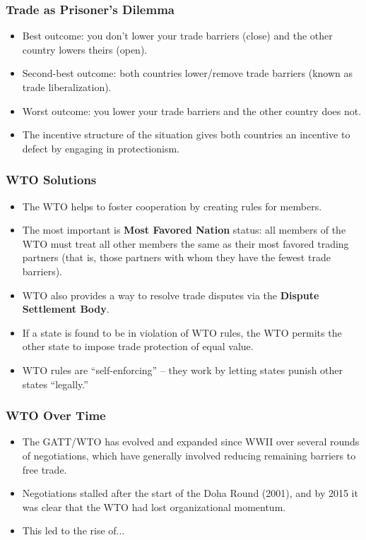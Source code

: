 \documentclass{beamer}
\begin{document}
\begin{frame} 
	\frametitle{\LARGE{Trade as Prisoner's Dilemma}}
	\begin{itemize}
			\item Best outcome: you don't lower your trade barriers (close) and the other country lowers theirs (open). \pause 
			\item Second-best outcome: both countries lower/remove trade barriers (known as trade liberalization). \pause
			\item Worst outcome: you lower your trade barriers and the other country does not. \pause
			\item The incentive structure of the situation gives both countries an incentive to defect by engaging in protectionism. 
	\end{itemize}
\end{frame}

\begin{frame} 
	\frametitle{\LARGE{WTO Solutions}}
	\begin{itemize}
		\item The WTO helps to foster cooperation by creating rules for members. \pause
		\item The most important is \textbf{Most Favored Nation} status: all members of the WTO must treat all other members the same as their most favored trading partners (that is, those partners with whom they have the fewest trade barriers). \pause
		\item WTO also provides a way to resolve trade disputes via the \textbf{Dispute Settlement Body}. \pause
		\item If a state is found to be in violation of WTO rules, the WTO permits the other state to impose trade protection of equal value. \pause
		\item WTO rules are “self-enforcing” – they work by letting states punish other states ``legally.”
	\end{itemize}
\end{frame}

\begin{frame} 
	\frametitle{\LARGE{WTO Over Time}}
	\begin{itemize}
			\item The GATT/WTO has evolved and expanded since WWII over several rounds of negotiations, which have generally involved reducing remaining barriers to free trade. \pause
			\item Negotiations stalled after the start of the Doha Round (2001), and by 2015 it was clear that the WTO had lost organizational momentum.
			\item This led to the rise of...
	\end{itemize}
\end{frame}
\end{document}
